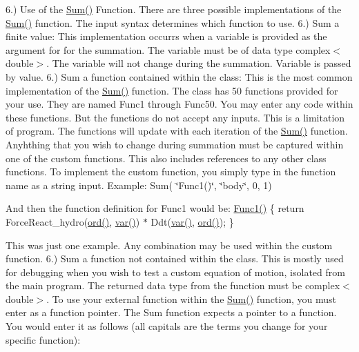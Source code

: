 6.) Use of the \hyperlink{classosea_1_1ofreq_1_1_equationof_motion_a5907d782ee639d5ec24515ed21050851}{Sum()} Function. There are three possible implementations of the \hyperlink{classosea_1_1ofreq_1_1_equationof_motion_a5907d782ee639d5ec24515ed21050851}{Sum()} function. The input syntax determines which function to use. 6.) Sum a finite value\-: This implementation occurrs when a variable is provided as the argument for for the summation. The variable must be of data type complex$<$double$>$. The variable will not change during the summation. Variable is passed by value. 6.) Sum a function contained within the class\-: This is the most common implementation of the \hyperlink{classosea_1_1ofreq_1_1_equationof_motion_a5907d782ee639d5ec24515ed21050851}{Sum()} function. The class has 50 functions provided for your use. They are named Func1 through Func50. You may enter any code within these functions. But the functions do not accept any inputs. This is a limitation of program. The functions will update with each iteration of the \hyperlink{classosea_1_1ofreq_1_1_equationof_motion_a5907d782ee639d5ec24515ed21050851}{Sum()} function. Anyhthing that you wish to change during summation must be captured within one of the custom functions. This also includes references to any other class functions. To implement the custom function, you simply type in the function name as a string input. Example\-: Sum( \char`\"{}\-Func1()\char`\"{}, \char`\"{}body\char`\"{}, 0, 1)

And then the function definition for Func1 would be\-: \hyperlink{classosea_1_1ofreq_1_1_eqn_rotation_aac7de76e4a8da885b4c06f9e694afff1}{Func1()} \{ return Force\-React\-\_\-hydro(\hyperlink{classosea_1_1ofreq_1_1_equationof_motion_a31f904818ce75c9e2a2b5cff9fc707a5}{ord()}, \hyperlink{classosea_1_1ofreq_1_1_equationof_motion_ab69511cc5037376cf7da80ce30d9eaab}{var()}) $\ast$ Ddt(\hyperlink{classosea_1_1ofreq_1_1_equationof_motion_ab69511cc5037376cf7da80ce30d9eaab}{var()}, \hyperlink{classosea_1_1ofreq_1_1_equationof_motion_a31f904818ce75c9e2a2b5cff9fc707a5}{ord()}); \}

This was just one example. Any combination may be used within the custom function. 6.) Sum a function not contained within the class. This is mostly used for debugging when you wish to test a custom equation of motion, isolated from the main program. The returned data type from the function must be complex$<$double$>$. To use your external function within the \hyperlink{classosea_1_1ofreq_1_1_equationof_motion_a5907d782ee639d5ec24515ed21050851}{Sum()} function, you must enter as a function pointer. The Sum function expects a pointer to a function. You would enter it as follows (all capitals are the terms you change for your specific function)\-:

